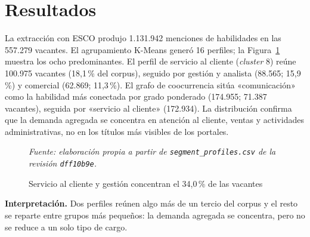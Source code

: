 \documentclass[journal]{IEEEtran}
\begin{document}
\section{Resultados}
La extracción con ESCO produjo 1.131.942 menciones de habilidades en las 557.279 vacantes. El agrupamiento K-Means generó 16 perfiles; la Figura~\ref{fig:segmentos} muestra los ocho predominantes. El perfil de servicio al cliente (\textit{cluster} 8) reúne 100.975 vacantes (18,1\,\% del corpus), seguido por gestión y analista (88.565; 15,9\,\%) y comercial (62.869; 11,3\,\%). El grafo de coocurrencia sitúa «comunicación» como la habilidad más conectada por grado ponderado (174.955; 71.387 vacantes), seguida por «servicio al cliente» (172.934). La distribución confirma que la demanda agregada se concentra en atención al cliente, ventas y actividades administrativas, no en los títulos más visibles de los portales.

\begin{figure}[H]
\centering
{}
\caption{Servicio al cliente y gestión concentran el 34,0\,\% de las vacantes}
\label{fig:segmentos}
\vspace{1pt}
{\footnotesize\textit{Fuente: elaboración propia a partir de \texttt{segment\_profiles.csv} de la revisión \texttt{dff10b9e}.}}
\end{figure}

\textbf{Interpretación.} Dos perfiles reúnen algo más de un tercio del corpus y el resto se reparte entre grupos más pequeños: la demanda agregada se concentra, pero no se reduce a un solo tipo de cargo.
\end{document}
